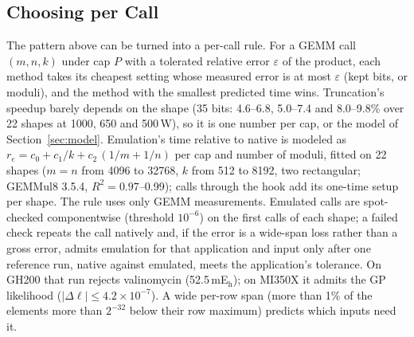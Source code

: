 \documentclass[conference]{IEEEtran}
\newcommand{\W}{\,W}
\newcommand{\ee}[2]{#1{\times}10^{#2}}  %
\newcommand{\pct}{\%}
\begin{document}
\subsection{Choosing per Call}\label{sec:selector}

The pattern above can be turned into a per-call rule. For a GEMM call $(m,n,k)$ under cap $P$ with a tolerated relative
error $\varepsilon$ of the product, each method takes its cheapest setting whose measured error is at most
$\varepsilon$ (kept bits, or moduli), and the method with the smallest predicted time wins. Truncation's speedup barely
depends on the shape (35 bits: 4.6--6.8, 5.0--7.4 and 8.0--9.8\pct{} over 22 shapes at 1000, 650 and 500\W), so it is
one number per cap, or the model of Section~\ref{sec:model}. Emulation's time relative to native is modeled as
$r_e = c_0 + c_1/k + c_2\,(1/m+1/n)$ per cap and number of moduli, fitted on 22 shapes ($m=n$ from 4096 to 32768, $k$ from 512
to 8192, two rectangular; GEMMul8 3.5.4, $R^2=0.97$--0.99); calls through the hook add its one-time setup per shape. The
rule uses only GEMM measurements. Emulated calls are spot-checked componentwise (threshold $10^{-6}$) on the first
calls of each shape; a failed check repeats the call natively and, if the error is a wide-span loss rather than a gross
error, admits emulation for that application and input only after one reference run, native against emulated, meets the
application's tolerance. On GH200 that run rejects valinomycin (52.5\,mE$_\mathrm{h}$); on MI350X it admits the GP likelihood
($|\Delta\ell|\le\ee{4.2}{-7}$). A wide per-row span (more than 1\pct{} of the elements more than $2^{-32}$ below their row
maximum) predicts which inputs need it.
\end{document}
